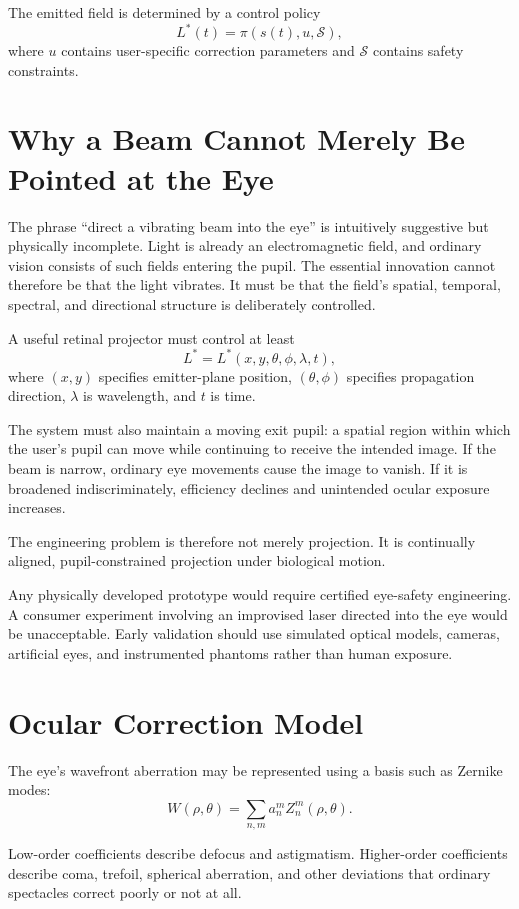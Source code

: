 \documentclass[11pt]{article}
\begin{document}
The emitted field is determined by a control policy
\[
L^\ast(t)=\pi(s(t),u,\mathcal{S}),
\]
where $u$ contains user-specific correction parameters and $\mathcal{S}$ contains safety constraints.

\section{Why a Beam Cannot Merely Be Pointed at the Eye}

The phrase ``direct a vibrating beam into the eye'' is intuitively suggestive but physically incomplete. Light is already an electromagnetic field, and ordinary vision consists of such fields entering the pupil. The essential innovation cannot therefore be that the light vibrates. It must be that the field's spatial, temporal, spectral, and directional structure is deliberately controlled.

A useful retinal projector must control at least
\[
L^\ast=L^\ast(x,y,\theta,\phi,\lambda,t),
\]
where $(x,y)$ specifies emitter-plane position, $(\theta,\phi)$ specifies propagation direction, $\lambda$ is wavelength, and $t$ is time.

The system must also maintain a moving exit pupil: a spatial region within which the user's pupil can move while continuing to receive the intended image. If the beam is narrow, ordinary eye movements cause the image to vanish. If it is broadened indiscriminately, efficiency declines and unintended ocular exposure increases.

The engineering problem is therefore not merely projection. It is continually aligned, pupil-constrained projection under biological motion.

Any physically developed prototype would require certified eye-safety engineering. A consumer experiment involving an improvised laser directed into the eye would be unacceptable. Early validation should use simulated optical models, cameras, artificial eyes, and instrumented phantoms rather than human exposure.

\section{Ocular Correction Model}

The eye's wavefront aberration may be represented using a basis such as Zernike modes:
\[
W(\rho,\theta)=\sum_{n,m}a_n^m Z_n^m(\rho,\theta).
\]

Low-order coefficients describe defocus and astigmatism. Higher-order coefficients describe coma, trefoil, spherical aberration, and other deviations that ordinary spectacles correct poorly or not at all.
\end{document}
